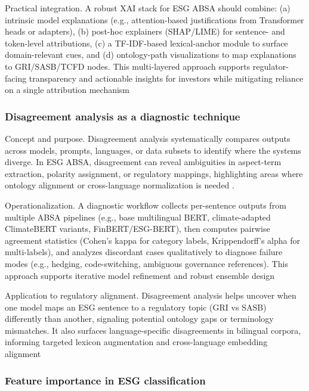 Practical integration. A robust XAI stack for ESG ABSA should combine: (a) intrinsic model explanations (e.g., attention-based justifications from Transformer heads or adapters), (b) post-hoc explainers (SHAP/LIME) for sentence- and token-level attributions, (c) a TF-IDF-based lexical-anchor module to surface domain-relevant cues, and (d) ontology-path visualizations to map explanations to GRI/SASB/TCFD nodes. This multi-layered approach supports regulator-facing transparency and actionable insights for investors while mitigating reliance on a single attribution mechanism \cite{10.1111/1475-679x.12575,10.3390/su11041093,10.2139/ssrn.3738629}
\subsubsection{Disagreement analysis as a diagnostic technique}

Concept and purpose. Disagreement analysis systematically compares outputs across models, prompts, languages, or data subsets to identify where the systems diverge. In ESG ABSA, disagreement can reveal ambiguities in aspect-term extraction, polarity assignment, or regulatory mappings, highlighting areas where ontology alignment or cross-language normalization is needed \cite{10.48550/arxiv.2510.22964,10.1145/3630106.3658966}.

Operationalization. A diagnostic workflow collects per-sentence outputs from multiple ABSA pipelines (e.g., base multilingual BERT, climate-adapted ClimateBERT variants, FinBERT/ESG-BERT), then computes pairwise agreement statistics (Cohen’s kappa for category labels, Krippendorff’s alpha for multi-labels), and analyzes discordant cases qualitatively to diagnose failure modes (e.g., hedging, code-switching, ambiguous governance references). This approach supports iterative model refinement and robust ensemble design \cite{10.48550/arxiv.2510.22964,10.1145/3630106.3658966,10.48550/arxiv.2108.01415}

Application to regulatory alignment. Disagreement analysis helps uncover when one model maps an ESG sentence to a regulatory topic (GRI vs SASB) differently than another, signaling potential ontology gaps or terminology mismatches. It also surfaces language-specific disagreements in bilingual corpora, informing targeted lexicon augmentation and cross-language embedding alignment \cite{10.1016/j.inffus.2025.103073,10.1111/eufm.12509,10.48550/arxiv.2511.00024}

\subsubsection{Feature importance in ESG classification}


